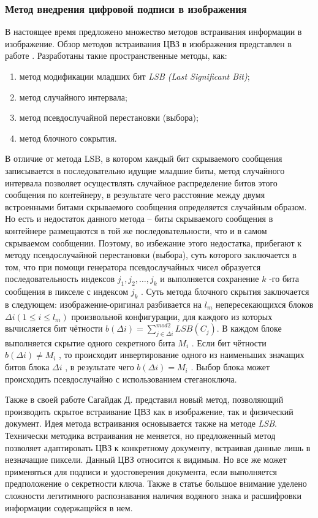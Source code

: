 \subsubsection{Метод внедрения цифровой подписи в изображения}
\par В настоящее время предложено множество методов встраивания информации в изображение. Обзор методов встраивания ЦВЗ в изображения представлен в работе \cite{sagaydak2014}. Разработаны такие пространственные методы, как:
\begin{enumerate}
\item метод модификации младших бит \textit{LSB (Last Significant Bit)};
\item метод случайного интервала;
\item метод псевдослучайной перестановки (выбора);
\item метод блочного сокрытия.
\end{enumerate}
\par В отличие от метода LSB, в котором каждый бит
скрываемого сообщения записывается в последовательно идущие младшие биты, метод случайного интервала позволяет осуществлять случайное распределение битов этого сообщения по контейнеру, в результате чего расстояние между двумя встроенными
битами скрываемого сообщения определяется случайным образом. Но есть и недостаток данного метода -- биты скрываемого сообщения в контейнере
размещаются в той же последовательности, что и в
самом скрываемом сообщении. Поэтому, во избежание этого недостатка, прибегают к методу псевдослучайной перестановки (выбора), суть которого заключается в том, что при помощи генератора псевдослучайных чисел образуется последовательность индексов $j_1,j_2,\dots,j_k$ и выполняется сохранение $k$ -го бита
сообщения в пикселе с индексом $j_k$ .
Суть метода блочного скрытия заключается в следующем: изображение-оригинал разбивается на $l_m$
непересекающихся блоков $ \Delta i ( 1 \le i \le l_m ) $ произвольной конфигурации, для каждого из которых вычисляется бит чётности $b ( \Delta i ) = \sum_{j \in \Delta i}^{mod 2} LSB(C_j)$.
В каждом блоке выполняется скрытие одного секретного бита
$M_i$ . Если бит чётности $b ( \Delta i ) \ne M_i$ , то происходит
инвертирование одного из наименьших значащих битов блока $\Delta i$ , в результате чего $b ( \Delta i ) = M_i$ . Выбор блока может происходить псевдослучайно с использованием стеганоключа.

Также в своей работе Сагайдак Д. представил новый метод, позволяющий производить скрытое встраивание ЦВЗ как в изображение, так и физический документ. Идея метода встраивания основывается также на методе \textit{LSB}. 
Технически методика встраивания не меняется, но предложенный метод позволяет адаптировать ЦВЗ к конкретному документу, встраивая данные лишь в незначащие пиксели. Данный ЦВЗ относится к видимым. Но все же может применяться для подписи и удостоверения документа, если выполняется предположение о секретности ключа. Также в статье большое внимание уделено сложности легитимного распознавания наличия водяного знака и расшифровки информации содержащейся в нем. 